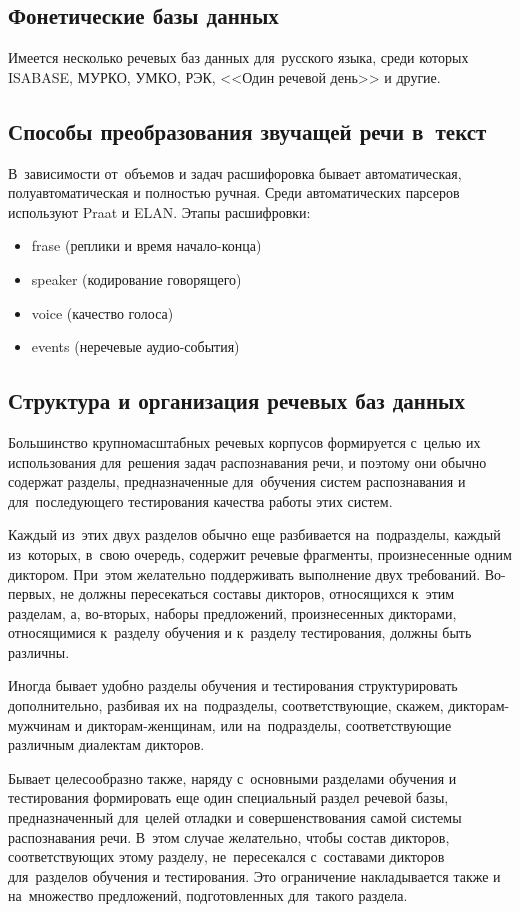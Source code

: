 \documentclass[12pt]{article}
\theoremstyle{definition}
\theoremstyle{remark}
\numberwithin{equation}{section}
\begin{document}
\subsection{Фонетические базы данных}
Имеется несколько речевых баз данных для~русского языка, среди которых
ISABASE, МУРКО, УМКО, РЭК, <<Один речевой день>> и другие.

\subsection{Способы преобразования звучащей речи в~текст}
В~зависимости от~объемов и задач расшифоровка бывает автоматическая,
полуавтоматическая и полностью ручная. Среди автоматических парсеров
используют Praat и ELAN. Этапы расшифровки:
\begin{itemize}
    \item frase (реплики и время начало-конца)
    \item speaker (кодирование говорящего)
    \item voice (качество голоса)
    \item events (неречевые аудио-события)
\end{itemize}

\subsection{Структура и организация речевых баз данных}
Большинство крупномасштабных речевых корпусов формируется с~целью их
использования для~решения задач распознавания речи, и поэтому они обычно
содержат разделы, предназначенные для~обучения систем распознавания и
для~последующего тестирования качества работы этих систем.

Каждый из~этих двух разделов обычно еще разбивается на~подразделы, каждый
из~которых, в~свою очередь, содержит речевые фрагменты, произнесенные
одним диктором. При~этом желательно поддерживать выполнение двух требований.
Во-первых, не должны пересекаться составы дикторов, относящихся к~этим
разделам, а, во-вторых, наборы предложений, произнесенных дикторами,
относящимися к~разделу обучения и к~разделу тестирования, должны быть
различны.

Иногда бывает удобно разделы обучения и тестирования структурировать
дополнительно, разбивая их на~подразделы, соответствующие, скажем,
дикторам-мужчинам и дикторам-женщинам, или на~подразделы, соответствующие
различным диалектам дикторов.

Бывает целесообразно также, наряду с~основными разделами обучения и
тестирования формировать еще один специальный раздел речевой базы,
предназначенный для~целей отладки и совершенствования самой системы
распознавания речи. В~этом случае желательно, чтобы состав дикторов,
соответствующих этому разделу, не~пересекался с~составами дикторов
для~разделов обучения и тестирования. Это ограничение накладывается
также и на~множество предложений, подготовленных для~такого раздела.
\end{document}
